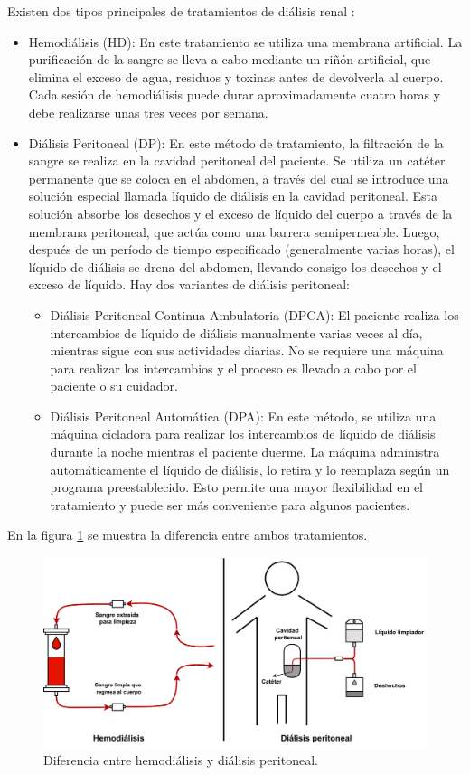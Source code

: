 Existen dos tipos principales de tratamientos de diálisis renal \citep{ARTICULO1}:

\begin{itemize}
\item Hemodiálisis (HD): En este tratamiento se utiliza una membrana artificial. La purificación de la sangre se lleva a cabo mediante un riñón artificial, que elimina el exceso de agua, residuos y toxinas antes de devolverla al cuerpo. Cada sesión de hemodiálisis puede durar aproximadamente cuatro horas y debe realizarse unas tres veces por semana.
\item Diálisis Peritoneal (DP): En este método de tratamiento, la filtración de la sangre se realiza en la cavidad peritoneal del paciente. Se utiliza un catéter permanente que se coloca en el abdomen, a través del cual se introduce una solución especial llamada líquido de diálisis en la cavidad peritoneal. Esta solución absorbe los desechos y el exceso de líquido del cuerpo a través de la membrana peritoneal, que actúa como una barrera semipermeable. Luego, después de un período de tiempo especificado (generalmente varias horas), el líquido de diálisis se drena del abdomen, llevando consigo los desechos y el exceso de líquido. Hay dos variantes de diálisis peritoneal: 
    \begin{itemize}
    \item Diálisis Peritoneal Continua Ambulatoria (DPCA): El paciente realiza los intercambios de líquido de diálisis manualmente varias veces al día, mientras sigue con sus actividades diarias. No se requiere una máquina para realizar los intercambios y el proceso es llevado a cabo por el paciente o su cuidador.
    \item Diálisis Peritoneal Automática (DPA): En este método, se utiliza una máquina cicladora para realizar los intercambios de líquido de diálisis durante la noche mientras el paciente duerme. La máquina administra automáticamente el líquido de diálisis, lo retira y lo reemplaza según un programa preestablecido. Esto permite una mayor flexibilidad en el tratamiento y puede ser más conveniente para algunos pacientes.
    \end{itemize}
\end{itemize}

En la figura \ref{fig:diagDialisis} se muestra la diferencia entre ambos tratamientos.

\begin{figure}[htpb]
\centering 
\includegraphics[width=.95\textwidth]{./Figures/Dialisis.pdf}
\caption{Diferencia entre hemodiálisis y diálisis peritoneal.}
\label{fig:diagDialisis}
\end{figure}


